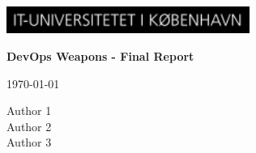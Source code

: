 \begin{titlepage}
    \centering
    \includegraphics[width=300px]{images/itu_logo_svg-raw.png}
    \vspace*{\fill}
    {\LARGE \textbf{DevOps Weapons - Final Report} \par}
    \vspace{1cm}
    {\large \today \par}
    \vspace{1cm}
    {\large Author 1 \\ Author 2 \\ Author 3 \par}
    \vspace*{\fill}
\end{titlepage}